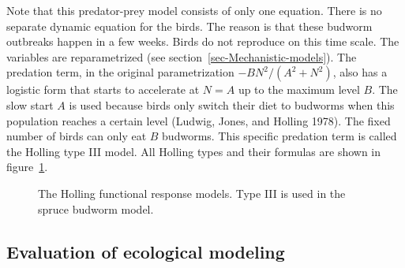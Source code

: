 \documentclass[
  a4paper,
  DIV=11,
  numbers=noendperiod,
  oneside]{scrreprt}
\begin{document}
Note that this predator-prey model consists of only one equation. There
is no separate dynamic equation for the birds. The reason is that these
budworm outbreaks happen in a few weeks. Birds do not reproduce on this
time scale. The variables are reparametrized (see
section~\ref{sec-Mechanistic-models}). The predation term, in the
original parametrization \(- BN^{2}/(A^{2} + N^{2})\), also has a
logistic form that starts to accelerate at \(N = A\) up to the maximum
level \(B\). The slow start \(A\) is used because birds only switch
their diet to budworms when this population reaches a certain level
(Ludwig, Jones, and Holling 1978). The fixed number of birds can only
eat \(B\) budworms. This specific predation term is called the Holling
type III model. All Holling types and their formulas are shown in
figure~\ref{fig-ch4n-img5-old-53}.

\begin{figure}


\caption{\label{fig-ch4n-img5-old-53}The Holling functional response
models. Type III is used in the spruce budworm model.}

\end{figure}%

\subsection{Evaluation of ecological
modeling}\label{sec-Evaluation-of-ecological-modelling}
\end{document}
